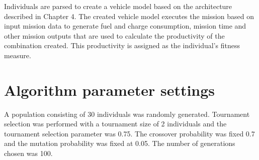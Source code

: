\documentclass[ExampleMasters.tex]{subfiles}
\begin{document}
		Individuals are parsed to create a vehicle model based on the architecture described in Chapter 4. The created vehicle model executes the mission based on input mission data to generate fuel and charge consumption, mission time and other mission outputs that are used to calculate the productivity of the combination created. This productivity is assigned as the individual's fitness measure.\\

	\section{Algorithm parameter settings}
		A population consisting of 30 individuals was randomly generated. Tournament selection was performed with a tournament size of 2 individuals and the tournament selection parameter was 0.75. The crossover probability was fixed 0.7 and the mutation probability was fixed at 0.05. The number of generations chosen was 100.\\
\end{document}
